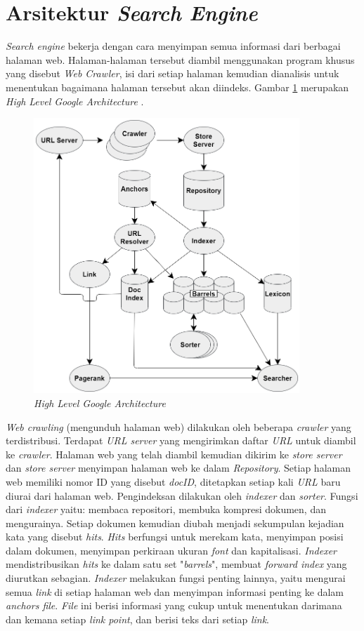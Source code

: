 \section{Arsitektur \emph{Search Engine}}

\emph{Search engine} bekerja dengan cara menyimpan semua informasi dari berbagai halaman web. Halaman-halaman tersebut diambil menggunakan program khusus yang disebut \emph{Web Crawler}, isi dari setiap halaman kemudian dianalisis untuk menentukan bagaimana halaman tersebut akan diindeks. Gambar \ref{gambar:google_architecture} merupakan \emph{High Level Google Architecture} \cite{brin1998anatomy}.

\begin{figure}[H]
	\centering
	\includegraphics[keepaspectratio, width=10cm]{gambar/google_architecture}
	\caption{\emph{High Level Google Architecture} \cite{brin1998anatomy}}
	\label{gambar:google_architecture}
\end{figure}

\emph{Web crawling} (mengunduh halaman web) dilakukan oleh beberapa \emph{crawler} yang terdistribusi. Terdapat \emph{URL server} yang mengirimkan daftar \emph{URL} untuk diambil ke \emph{crawler}. Halaman web yang telah diambil kemudian dikirim ke \emph{store server} dan \emph{store server} menyimpan halaman web ke dalam \emph{Repository}. Setiap halaman web memiliki nomor ID yang disebut \emph{docID}, ditetapkan setiap kali \emph{URL} baru diurai dari halaman web. Pengindeksan dilakukan oleh \emph{indexer} dan \emph{sorter}. Fungsi dari \emph{indexer} yaitu: membaca repositori, membuka kompresi dokumen, dan mengurainya. Setiap dokumen kemudian diubah menjadi sekumpulan kejadian kata yang disebut \emph{hits}. \emph{Hits} berfungsi untuk merekam kata, menyimpan posisi dalam dokumen, menyimpan perkiraan ukuran \emph{font} dan kapitalisasi. \emph{Indexer} mendistribusikan \emph{hits} ke dalam satu set "\emph{barrels}", membuat \emph{forward index} yang diurutkan sebagian. \emph{Indexer} melakukan fungsi penting lainnya, yaitu mengurai semua \emph{link} di setiap halaman web dan menyimpan informasi penting ke dalam \emph{anchors file}. \emph{File} ini berisi informasi yang cukup untuk menentukan darimana dan kemana setiap \emph{link point}, dan berisi teks dari setiap \emph{link}.

